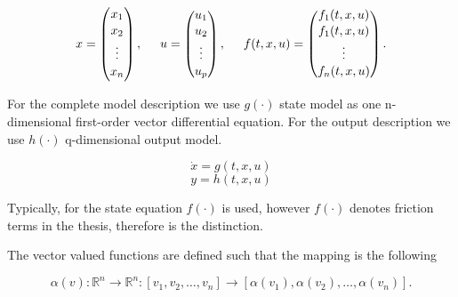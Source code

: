 \vspace{-4mm}
\begin{equation*}
\label{example1_signals_constants}
x =
 \begin{pmatrix} 
 x_1 \\[1.3pt] 
 x_2 \\[1.3pt]
 \vdots \\[1.3pt] 
 x_n \\[1.3pt] 
 \end{pmatrix}
 , \hspace{5mm}
u =  \begin{pmatrix} 
 u_1 \\[1pt] 
 u_2 \\[1pt]
 \vdots \\[1pt] 
 u_p \\[1pt] 
 \end{pmatrix}
 , \hspace{5mm}
 f(t,x,u) =  \begin{pmatrix} 
 f_1(t,x,u) \\[1pt] 
 f_1(t,x,u) \\[1pt]
 \vdots \\[1pt] 
 f_n(t,x,u) \\[1pt] 
 \end{pmatrix}.
\end{equation*}

\vspace{-2mm}
For the complete model description we use $g(\cdot)$ state model as one n-dimensional first-order vector differential equation. For the output description we use $h(\cdot)$ q-dimensional output model. 

\vspace{-6mm}
\begin{equation*}
\dot{x} = g(t,x,u)
\end{equation*}
\vspace{-8mm}
\begin{equation*}
y = h(t,x,u)
\end{equation*}
\vspace{-6mm}

Typically, for the state equation $f(\cdot)$ is used, however $f(\cdot)$ denotes friction terms in the thesis, therefore is the distinction. 

The vector valued functions are defined such that the mapping is the following

\vspace{-4mm}
 \begin{equation*}
 \alpha(v) : {\mathbb{R}}^{n} \rightarrow {\mathbb{R}}^{n} : [v_1, v_2, \hdots, v_n] \rightarrow [\alpha(v_1), \alpha(v_2),\hdots,\alpha(v_n)].
 \end{equation*}

